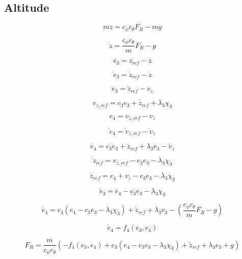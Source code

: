 \subsection{Altitude}

\[
m \ddot{z} = c_{\phi} c_{\theta} F_R - m g
\]

\[
\ddot{z} = \frac{c_{\phi} c_{\theta}}{m} F_R - g
\]

\[
e_3 = z_{ref} - z
\]

\[
\dot{e}_3 = \dot{z}_{ref} - \dot{z}
\]

\[
\dot{e}_3 = \dot{z}_{ref} - v_z
\]

\[
v_{z,ref} = c_3 e_3 + \dot{z}_{ref} + \lambda_3 \chi_3
\]

\[
e_4 = v_{z,ref} - v_z
\]

\[
\dot{e}_4 = \dot{v}_{z,ref} - \dot{v}_z
\]

\[
\dot{e}_4 = c_3 \dot{e}_3 + \ddot{z}_{ref} + \lambda_3 e_3 - \dot{v}_z
\]

\[
\dot{z}_{ref} = v_{z,ref} - c_3 e_3 - \lambda_3 \chi_3 
\]

\[
\dot{z}_{ref} = e_4 + v_z - c_3 e_3 - \lambda_3 \chi_3 
\]


\[
\dot{e}_3 = e_4 - c_3 e_3 - \lambda_3 \chi_3
\]

\[
\dot{e}_4 = c_3 \left( e_4 - c_3 e_3 - \lambda_3 \chi_3 \right) + \ddot{z}_{ref} + \lambda_3 e_3
- \left( \frac{c_{\phi} c_{\theta}}{m} F_R - g \right)
\]


\[
\dot{e}_4 = f_4(e_3,e_4)
\]

\[
F_R
= \frac{m}{c_{\phi} c_{\theta}} \left( -f_4(e_3,e_4)
+ c_3 \left( e_4 - c_3 e_3 - \lambda_3 \chi_3 \right) + \ddot{z}_{ref} + \lambda_3 e_3 + g \right)
\]










